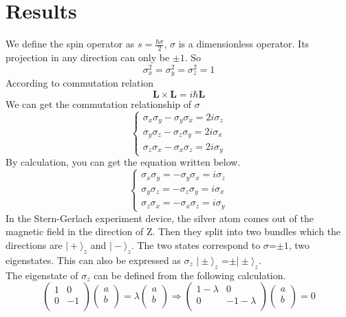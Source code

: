 \documentclass[a4paper]{article}
\newcommand{\ket}[1]{\big|  #1 \big \rangle }
\begin{document}
\section{Results}
\quad We define the spin operator as $s=\frac{\hbar \sigma}{2}$,
$\sigma$ is a dimensionless operator. Its projection in any direction can only be $\pm1$. So
\begin{equation}
\sigma_x^2=\sigma_y^2=\sigma_z^2=1
\end{equation}
According to commutation relation
\begin{equation}
\textbf{L}\times\textbf{L}=i\hbar\textbf{L}
\end{equation}
We can get the commutation relationship of $\sigma$
\begin{equation}
\begin{cases}
\sigma_x\sigma_y-\sigma_y\sigma_x=2i\sigma_z\\
\sigma_y\sigma_z-\sigma_z\sigma_y=2i\sigma_x\\
\sigma_z\sigma_x-\sigma_x\sigma_z=2i\sigma_y
\end{cases}
\end{equation}
By calculation, you can get the equation written below.
\begin{equation}
\begin{cases}
\sigma_x\sigma_y=-\sigma_y\sigma_x=i\sigma_z\\
\sigma_y\sigma_z=-\sigma_z\sigma_y=i\sigma_x\\
\sigma_z\sigma_x=-\sigma_x\sigma_z=i\sigma_y
\end{cases}
\end{equation}
In the Stern-Gerlach experiment device, the silver atom comes out of the magnetic field in the direction of Z. Then they split into two bundles which the directions are $\ket{+}_z$ and $\ket{-}_z$. The two states correspond to $\sigma$=$\pm1$, two eigenstates. This can also be expressed as $\sigma_z$ $\ket{\pm}_z$ =$\pm  \ket{\pm}_z$.\\
The eigenstate of $\sigma_z$ can be defined from the following calculation.
\begin{equation}
\begin{pmatrix}
1&0\\0&-1\\
\end{pmatrix}
\begin{pmatrix}
a\\b\\
\end{pmatrix}
=\lambda
\begin{pmatrix}
a\\b\\
\end{pmatrix}
\Rightarrow
\begin{pmatrix}
1-\lambda&0\\0&-1-\lambda\\
\end{pmatrix}
\begin{pmatrix}
a\\b\\
\end{pmatrix}
=0
\end{equation}
\end{document}
